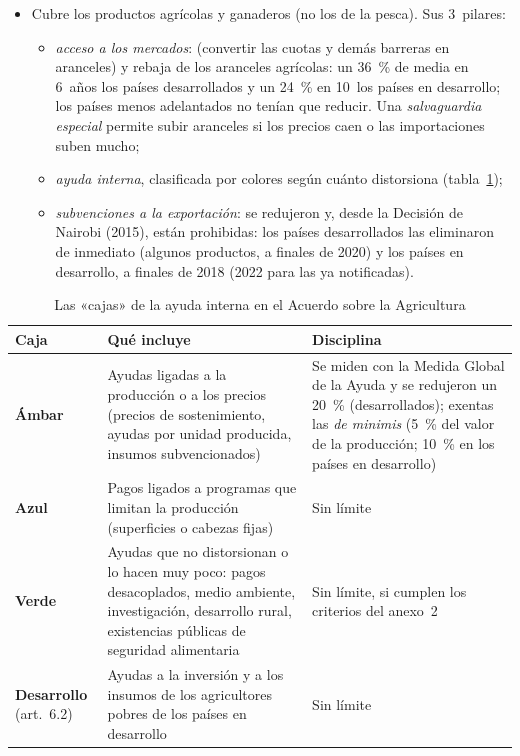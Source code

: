 \documentclass[11pt]{article}
\begin{document}
\begin{itemize}
\item Cubre los productos agrícolas y ganaderos (no los de la pesca). Sus 3~pilares\nocite{OMC1994Agricultura}:
  \begin{itemize}
  \item \emph{acceso a los mercados}:  (convertir las cuotas y demás barreras en aranceles) y rebaja de los aranceles agrícolas: un 36~\% de media en 6~años los países desarrollados y un 24~\% en 10~los países en desarrollo; los países menos adelantados no tenían que reducir. Una \emph{salvaguardia especial} permite subir aranceles si los precios caen o las importaciones suben mucho;
  \item \emph{ayuda interna}, clasificada por colores según cuánto distorsiona (tabla~\ref{tab:cajas});
  \item \emph{subvenciones a la exportación}: se redujeron y, desde la Decisión de Nairobi (2015), están prohibidas: los países desarrollados las eliminaron de inmediato (algunos productos, a finales de 2020) y los países en desarrollo, a finales de 2018 (2022 para las ya notificadas)\nocite{OMC2015CompetenciaExportaciones}.
  \end{itemize}
\end{itemize}

\begin{table}[H]
\centering
\caption{Las «cajas» de la ayuda interna en el Acuerdo sobre la Agricultura}\label{tab:cajas}
\small
\begin{tabular}{>{\raggedright\arraybackslash}m{2.6cm}>{\raggedright\arraybackslash}m{6.2cm}>{\raggedright\arraybackslash}m{5.6cm}}
\toprule
\rowcolor{tceeazulpalido} \textbf{Caja} & \textbf{Qué incluye} & \textbf{Disciplina}\\
\midrule
\textcolor{tceedorado}{\textbf{Ámbar}} & Ayudas ligadas a la producción o a los precios (precios de sostenimiento, ayudas por unidad producida, insumos subvencionados) & Se miden con la Medida Global de la Ayuda y se redujeron un 20~\% (desarrollados); exentas las \emph{de minimis} (5~\% del valor de la producción; 10~\% en los países en desarrollo)\\
\addlinespace[0.3em]
\textcolor{tceeazul}{\textbf{Azul}} & Pagos ligados a programas que limitan la producción (superficies o cabezas fijas) & Sin límite\\
\addlinespace[0.3em]
\textcolor{tceeverde}{\textbf{Verde}} & Ayudas que no distorsionan o lo hacen muy poco: pagos desacoplados, medio ambiente, investigación, desarrollo rural, existencias públicas de seguridad alimentaria & Sin límite, si cumplen los criterios del anexo~2\\
\addlinespace[0.3em]
\textbf{Desarrollo} (art.~6.2) & Ayudas a la inversión y a los insumos de los agricultores pobres de los países en desarrollo & Sin límite\\
\bottomrule
\end{tabular}
\end{table}
\end{document}
